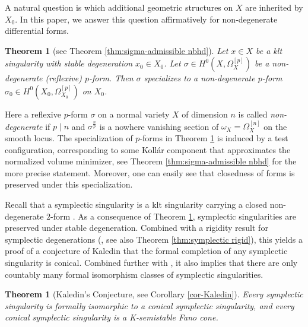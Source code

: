 \documentclass[12pt]{amsart}
\newtheorem{thm}[prop]{Theorem}
\theoremstyle{definition}
\numberwithin{equation}{section}
\begin{document}
A natural question is which additional geometric structures on $X$ are inherited by $X_0$. In this paper, we answer this question affirmatively for non-degenerate differential forms.

\begin{thm}[see Theorem \ref{thm:sigma-admissible nbhd}]\label{main-thm:degenerate}
Let $x \in X$ be a klt singularity with stable degeneration $x_0 \in X_0$. Let $\sigma \in H^0(X, \Omega^{[p]}_X)$ be a non-degenerate (reflexive) $p$-form. Then $\sigma$ specializes to a non-degenerate $p$-form $\sigma_0 \in H^0(X_0, \Omega^{[p]}_{X_0})$ on $X_0$.
\end{thm}

Here a reflexive $p$-form $\sigma$ on a normal variety $X$ of dimension $n$ is called \emph{non-degenerate} if $p \mid n$ and $\sigma^{\frac{n}{p}}$ is a nowhere vanishing section of $\omega_X=\Omega^{[n]}_X$ on the smooth locus. The specialization of $p$-forms in Theorem \ref{main-thm:degenerate} is induced by a test configuration, corresponding to some Koll\'ar component that approximates the normalized volume minimizer, see Theorem \ref{thm:sigma-admissible nbhd} for the more precise statement.  Moreover, one can easily see that closedness of forms is preserved under this specialization. 

Recall that a symplectic singularity is a klt singularity carrying a closed non-degenerate $2$-form \cite{Bea-symp-sing}. As a consequence of Theorem \ref{main-thm:degenerate}, symplectic singularities are preserved under stable degeneration. Combined with a rigidity result for symplectic degenerations (\cite{Namikawa-deformation-terminal,Namikawa-deformation,Namikawa-notes-on-deformation,NO-symp}, see also Theorem \ref{thm:symplectic rigid}), this yields a proof of a conjecture of Kaledin \cites{Kaledin-sym, Kaledin-survey} that the formal completion of any symplectic singularity is conical. Combined further with \cite{Namikawa-finite}, it also implies that there are only countably many formal isomorphism classes of symplectic singularities. 

\begin{thm}[Kaledin's Conjecture, see Corollary \ref{cor-Kaledin}]\label{main-thm:Kaledin}
Every symplectic singularity is formally isomorphic to a conical symplectic singularity, and every conical symplectic singularity is a K-semistable Fano cone.
\end{thm}
\end{document}
